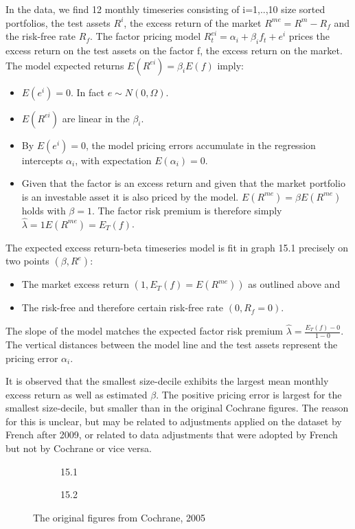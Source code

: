 \documentclass[]{article}
\begin{document}
In the data, we find 12 monthly timeseries consisting of i=1,..,10 size sorted portfolios, the test assets $R^{i}$, the excess return of the market $R^{me}=R^m - R_f$ and the risk-free rate $R_f$. The factor pricing model $R_t^{ei}=\alpha_i + \beta_i f_t+e^i$ prices the excess return on the test assets on the factor f, the excess return on the market. The model expected returns $E(R^{ei})=\beta_iE(f)$ imply:
\begin{itemize}
	\item $E(e^i)=0$. In fact $e\sim N(0,\Omega)$.
	\item $E(R^{ei})$ are linear in the $\beta_i$.
	\item By $E(e^i)=0$, the model pricing errors accumulate in the regression intercepts $\alpha_i$, with expectation $E(\alpha_i)=0$.
	\item Given that the factor is an excess return and given that the market portfolio is an investable asset it is also priced by the model. $E(R^{me}) = \beta E(R^{me})$ holds with $\beta=1$. The factor risk premium is therefore simply $\hat{\lambda}=1 E(R^{me}) = E_T(f)$.
\end{itemize}

The expected excess return-beta timeseries model is fit in graph 15.1 precisely on two points $(\beta, R^e)$:
\begin{itemize}
	\item The market excess return $(1, E_T(f)=E(R^{me}))$ as outlined above and
	\item The risk-free and therefore certain risk-free rate $(0, R_f=0)$. 
\end{itemize}

The slope of the model matches the expected factor risk premium $\hat{\lambda} = \frac{E_T(f)-0}{1-0}$. The vertical distances between the model line and the test assets represent the pricing error $\alpha_i$.

It is observed that the smallest size-decile exhibits the largest mean monthly excess return as well as estimated $\beta$. The positive pricing error is largest for the smallest size-decile, but smaller than in the original Cochrane figures. The reason for this is unclear, but may be related to adjustments applied on the dataset by French after 2009, or related to data adjustments that were adopted by French but not by Cochrane or vice versa.

\begin{figure}[H]
	\begin{subfigure}{0.5\textwidth}
		\caption{15.1}
		\label{fig:subim3}
	\end{subfigure}
	\begin{subfigure}{0.5\textwidth}
		\caption{15.2}
		\label{fig:subim4}
	\end{subfigure}	
	\caption{The original figures from Cochrane, 2005}
	\label{fig:image2}
\end{figure}
	
\end{document}
